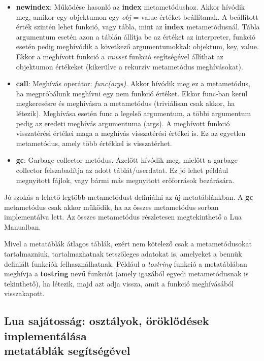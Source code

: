 \begin{itemize}
	\item \detokenize{__}\textbf{newindex}: Működése hasonló az \detokenize{__}\textbf{index} metametódushoz. Akkor hívódik meg, amikor egy objektumon egy \textit{obj}\detokenize{[key]} = value értéket beállítanak. A beállított érték szintén lehet funkció, vagy tábla, mint az \detokenize{__}\textbf{index} metametódusnál. Tábla argumentum esetén azon a táblán állítja be az értéket az interpreter, funkció esetén pedig meghívódik a következő argumentumokkal: objektum, key, value. Ekkor a meghívott funkció a \textit{rawset} funkció segítségével állíthat az objektumon értékeket (kikerülve a rekurzív metametódus meghívásokat).
	\item \detokenize{__}\textbf{call}: Meghívás operátor: \emph{func(args)}. Akkor hívódik meg ez a metametódus, ha megpróbálunk meghívni egy nem funkció értéket. Ekkor func-ban kerül megkeresésre és meghívásra a metametódus (triviálisan csak akkor, ha létezik). Meghívása esetén func a legelső argumentum, a többi argumentum pedig az eredeti meghívás argumentuma (args). A meghívott funkció visszatérési értékei maga a meghívás visszatérési értékei is. Ez az egyetlen metametódus, amely több értékkel is visszatérhet.
	\item \detokenize{__}\textbf{gc}: Garbage collector metódus. Azelőtt hívódik meg, mielőtt a garbage collector felszabadítja az adott táblát/userdatat. Ez jó lehet például megnyitott fájlok, vagy bármi más megnyitott erőforrások bezárására.
\end{itemize}

Jó szokás a lehető legtöbb metametódust definiálni az új metatáblánkban. A \detokenize{__}\textbf{gc} metametódus csak akkor működik, ha az összes metametódus sorban implementálva lett. Az összes metametódus részletesen megtekinthető a Lua Manualban.

Mivel a metatáblák átlagos táblák, ezért nem kötelező csak a metametódusokat tartalmazniuk, tartalmazhatnak tetszőleges adatokat is, amelyeket a bennük definiált funkciók felhasználhatnak. Például a \textit{tostring} funkció a metatáblában meghívja a \detokenize{__}\textbf{tostring} nevű funkciót (amely igazából egyedi metametódusnak is tekinthető), ha létezik, majd azt adja vissza, amit a funkció meghívásából visszakapott. \cite{metatable1}

\subsection{Lua sajátosság: osztályok, öröklődések implementálása\\metatáblák segítségével}

